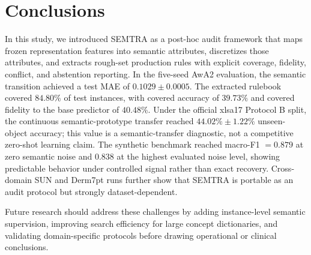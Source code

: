 \documentclass[make,article,submit,pdftex,moreauthors]{Definitions/mdpi}
\begin{document}
\section{Conclusions}
\label{sec:conclusions}

In this study, we introduced SEMTRA as a post-hoc audit framework that maps frozen representation features into semantic attributes, discretizes those attributes, and extracts rough-set production rules with explicit coverage, fidelity, conflict, and abstention reporting. In the five-seed AwA2 evaluation, the semantic transition achieved a test MAE of $0.1029 \pm 0.0005$. The extracted rulebook covered $84.80\%$ of test instances, with covered accuracy of $39.73\%$ and covered fidelity to the base predictor of $40.48\%$. Under the official xlsa17 Protocol B split, the continuous semantic-prototype transfer reached $44.02\% \pm 1.22\%$ unseen-object accuracy; this value is a semantic-transfer diagnostic, not a competitive zero-shot learning claim. The synthetic benchmark reached macro-F1 $=0.879$ at zero semantic noise and $0.838$ at the highest evaluated noise level, showing predictable behavior under controlled signal rather than exact recovery. Cross-domain SUN and Derm7pt runs further show that SEMTRA is portable as an audit protocol but strongly dataset-dependent.

Future research should address these challenges by adding instance-level semantic supervision, improving search efficiency for large concept dictionaries, and validating domain-specific protocols before drawing operational or clinical conclusions.

\vspace{6pt}

\end{document}
